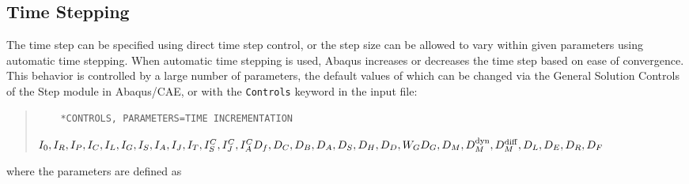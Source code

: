 \documentclass[10pt,letterpaper,oneside]{report}
\newcommand{\scas}[1]{\mbox{{\scriptsize{${\rm{#1}}$}}}{}}
\begin{document}
\subsection{Time Stepping}
The time step can be specified using direct time step control, or the step size can be allowed to vary within given parameters using automatic time stepping.  When automatic time stepping is used, Abaqus increases or decreases the time step based on ease of convergence.  This behavior is controlled by a large number of parameters, the default values of which can be changed via the General Solution Controls of the Step module in Abaqus/CAE, or with the \texttt{Controls} keyword in the input file:
\begin{quote} 
    \begin{lstlisting}
    *CONTROLS, PARAMETERS=TIME INCREMENTATION
    \end{lstlisting} 
    $I_0, I_R, I_P, I_C, I_L, I_G, I_S, I_A, I_J, I_T, I^C_S, I^C_J, I^C_A \\
    D_f, D_C, D_B, D_A, D_S, D_H, D_D, W_G \\
    D_G, D_M, D_M^{\scas{dyn}}, D_M^{\scas{diff}}, D_L, D_E, D_R, D_F$
\end{quote}
where the parameters are defined as 
\end{document}

